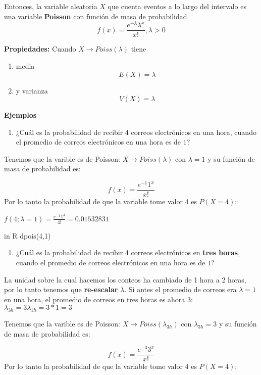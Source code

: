 \documentclass[
]{book}
\providecommand{\tightlist}{%
  \setlength{\itemsep}{0pt}\setlength{\parskip}{0pt}}
\begin{document}
Entonces, la variable aleatoria \(X\) que cuenta eventos a lo largo del intervalo es una variable \textbf{Poisson} con función de masa de probabilidad
\[f(x)= \frac{e^{-\lambda}\lambda^x}{x!}, \lambda>0\]

\textbf{Propiedades:}
Cuando \(X \rightarrow Poiss(\lambda)\) tiene

\begin{enumerate}
\def\labelenumi{\arabic{enumi})}
\tightlist
\item
  media \[E(X)= \lambda\]
\item
  y varianza \[V(X)= \lambda\]
\end{enumerate}

\textbf{Ejemplos}

\begin{enumerate}
\def\labelenumi{\arabic{enumi})}
\tightlist
\item
  ¿Cuál es la probabilidad de recibir 4 correos electrónicos en una hora, cuando el promedio de correos electrónicos en una hora es de \(1\)?
\end{enumerate}

Tenemos que la varible es de Poisson: \(X \rightarrow Poiss(\lambda)\) con \(\lambda=1\) y su función de masa de probabilidad es:

\[f(x)= \frac{e^{-1}1^x}{x!}\]
Por lo tanto la probabilidad de que la variable tome valor 4 es \(P(X=4)\):

\(f(4; \lambda=1)= \frac{e^{-1}1^4}{4!}=0.01532831\)

in R dpois(4,1)

\begin{enumerate}
\def\labelenumi{\arabic{enumi})}
\setcounter{enumi}{1}
\tightlist
\item
  ¿Cuál es la probabilidad de recibir 4 correos electrónicos en \textbf{tres horas}, cuando el promedio de correos electrónicos en una hora es de \(1\)?
\end{enumerate}

La unidad sobre la cual hacemos los conteos ha cambiado de 1 hora a 2 horas, por lo tanto tenemos que \textbf{re-escalar} \(\lambda\). Si antes el promedio de correos era \(\lambda=1\) en una hora, el promedio de correos en tres horas es ahora 3: \(\lambda_{3h}=3\lambda_{1h}=3*1=3\)

Tenemos que la varible es de Poisson: \(X \rightarrow Poiss(\lambda_{3h})\) con \(\lambda_{3h}=3\) y su función de masa de probabilidad es:

\[f(x)= \frac{e^{-3}3^x}{x!}\]
Por lo tanto la probabilidad de que la variable tome valor 4 es \(P(X=4)\):
\end{document}
